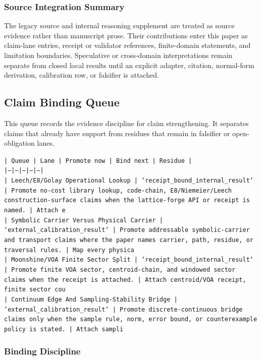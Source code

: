 \documentclass[11pt]{article}
\begin{document}
\subsubsection*{Source Integration Summary}

The legacy source and internal reasoning supplement are treated as source
evidence rather than manuscript prose. Their contributions enter this paper as
claim-lane entries, receipt or validator references, finite-domain statements,
and limitation boundaries. Speculative or cross-domain interpretations remain
separate from closed local results until an explicit adapter, citation,
normal-form derivation, calibration row, or falsifier is attached.
\subsection*{Claim Binding Queue}

This queue records the evidence discipline for claim strengthening. It separates claims that already have support from residues that remain in falsifier or open-obligation lanes.

\noindent\texttt{| Queue | Lane | Promote now | Bind next | Residue |}\\
\noindent\texttt{|---|---|---|---|---|}\\
\noindent\texttt{| Leech/E8/Golay Operational Lookup | `receipt\_bound\_internal\_result` | Promote no-cost library lookup, code-chain, E8/Niemeier/Leech construction-surface claims when the lattice-forge API or receipt is named. | Attach e}\\
\noindent\texttt{| Symbolic Carrier Versus Physical Carrier | `external\_calibration\_result` | Promote addressable symbolic-carrier and transport claims where the paper names carrier, path, residue, or traversal rules. | Map every physica}\\
\noindent\texttt{| Moonshine/VOA Finite Sector Split | `receipt\_bound\_internal\_result` | Promote finite VOA sector, centroid-chain, and windowed sector claims when the receipt is attached. | Attach centroid/VOA receipt, finite sector cou}\\
\noindent\texttt{| Continuum Edge And Sampling-Stability Bridge | `external\_calibration\_result` | Promote discrete-continuous bridge claims only when the sample rule, norm, error bound, or counterexample policy is stated. | Attach sampli}\\

\subsubsection*{Binding Discipline}
\end{document}
